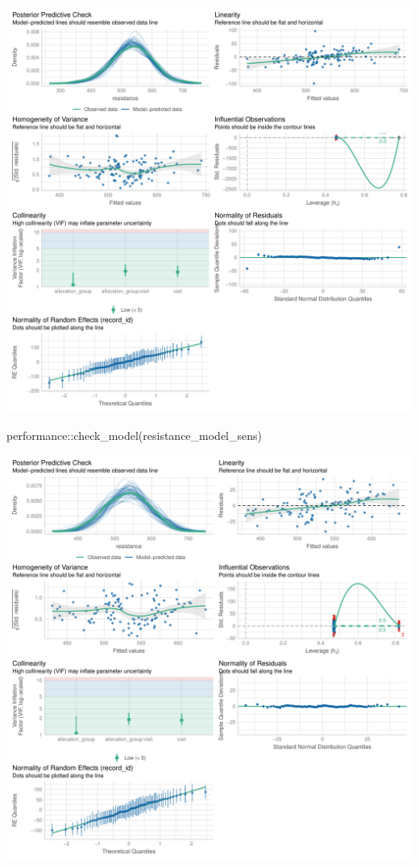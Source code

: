 \documentclass[
  letterpaper,
  DIV=11,
  numbers=noendperiod]{scrartcl}
\newenvironment{Shaded}{\begin{snugshade}}{\end{snugshade}}
\newcommand{\FunctionTok}[1]{\textcolor[rgb]{0.28,0.35,0.67}{#1}}
\newcommand{\NormalTok}[1]{\textcolor[rgb]{0.00,0.23,0.31}{#1}}
\newcommand{\SpecialCharTok}[1]{\textcolor[rgb]{0.37,0.37,0.37}{#1}}
\begin{document}
\includegraphics{Outcomes_V1V2V3_files/figure-pdf/resistance_4-1.pdf}

\begin{Shaded}
\begin{Highlighting}[]
\NormalTok{performance}\SpecialCharTok{::}\FunctionTok{check\_model}\NormalTok{(resistance\_model\_sens)}
\end{Highlighting}
\end{Shaded}

\includegraphics{Outcomes_V1V2V3_files/figure-pdf/resistance_4-2.pdf}
\end{document}
